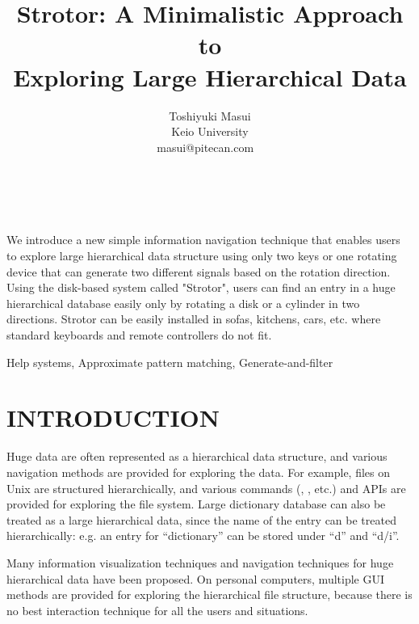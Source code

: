 \documentclass{article}
\begin{document}
\title{Strotor: A Minimalistic Approach to \\
Exploring Large Hierarchical Data}
\author{
\begin{tabular}{l}
\parbox{5.5cm}{
\begin{center}
Toshiyuki Masui\\
Keio University\\
masui@pitecan.com
~ \\
~ \\
~
\end{center}
}
\end{tabular}
}
\maketitle
\abstract
We introduce a new simple information navigation technique
that enables users to explore large hierarchical data structure
using only two keys or one rotating device that can generate
two different signals based on the rotation direction.
%
Using the disk-based system called "Strotor",
users can find an entry in a huge hierarchical database easily
only by rotating a disk or a cylinder in two directions.
%
Strotor can be easily installed in sofas, kitchens, cars, etc.
where standard keyboards and remote controllers do not fit.

\keywords Help systems, Approximate pattern matching, Generate-and-filter


\section*{INTRODUCTION}

Huge data are often represented as a hierarchical data structure, and
various navigation methods are provided for exploring the data.
For example, files on Unix are structured hierarchically, and
various commands (, , etc.) and APIs are provided for exploring the file system.
Large dictionary database can also be treated as a large
hierarchical data, since the name of the entry can be treated hierarchically:
e.g. an entry for ``dictionary'' can be stored under ``d'' and ``d/i''.

Many information visualization techniques and navigation techniques for huge hierarchical data
have been proposed.
On personal computers,
multiple GUI methods are provided for
exploring the hierarchical file structure, because
there is no best interaction technique for all the users and situations.
\end{document}
